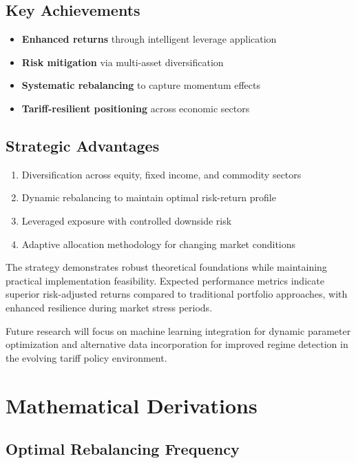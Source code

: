 \documentclass[onecolumn,11pt]{IEEEtran}
\begin{document}
\subsection{Key Achievements}
\begin{itemize}
    \item \textbf{Enhanced returns} through intelligent leverage application
    \item \textbf{Risk mitigation} via multi-asset diversification
    \item \textbf{Systematic rebalancing} to capture momentum effects
    \item \textbf{Tariff-resilient positioning} across economic sectors
\end{itemize}

\subsection{Strategic Advantages}
\begin{enumerate}
    \item Diversification across equity, fixed income, and commodity sectors
    \item Dynamic rebalancing to maintain optimal risk-return profile
    \item Leveraged exposure with controlled downside risk
    \item Adaptive allocation methodology for changing market conditions
\end{enumerate}

The strategy demonstrates robust theoretical foundations while maintaining practical implementation feasibility. Expected performance metrics indicate superior risk-adjusted returns compared to traditional portfolio approaches, with enhanced resilience during market stress periods.

Future research will focus on machine learning integration for dynamic parameter optimization and alternative data incorporation for improved regime detection in the evolving tariff policy environment.

\appendix

\section{Mathematical Derivations}

\subsection{Optimal Rebalancing Frequency}
\end{document}
